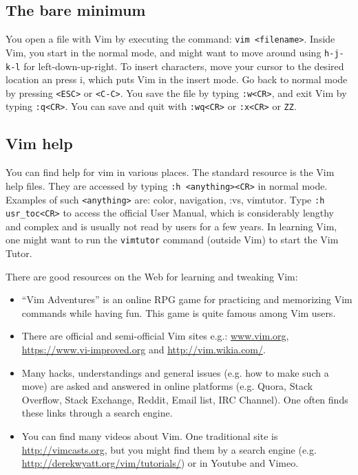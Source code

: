 \documentclass{article}
\newcommand{\tttt}[1]{\texttt{#1}}
\begin{document}
\subsection{The bare minimum}\label{minimum}
You open a file with Vim by executing
the command: \texttt{vim <filename>}.
Inside Vim, you start in the normal
mode, and might want to move around using
\texttt{h-j-k-l} for left-down-up-right.
To insert characters, move your
cursor to the desired location an press i,
which puts Vim in the insert mode.
Go back to normal mode by pressing
\texttt{<ESC>} or \texttt{<C-C>}.
You save the file by typing \texttt{:w<CR>},
and exit Vim by typing \texttt{:q<CR>}.
You can save and quit with \tttt{:wq<CR>}
or \tttt{:x<CR>} or \tttt{ZZ}.

\subsection{Vim help}
You can find help for vim in various places.
The standard resource is the Vim help files.
They are accessed by typing \texttt{:h <anything><CR>}
in normal mode.
Examples of such \texttt{<anything>} are:
color, navigation, :vs, vimtutor.
Type 
\texttt{:h usr\_toc<CR>}
to access the official User Manual,
which is considerably lengthy and complex
and is usually not read by users for a few years.
In learning Vim, one
might want to run the \texttt{vimtutor} command
(outside Vim) to start the Vim Tutor.

There are good resources on the Web for learning
and tweaking Vim:
\begin{itemize}
  \item ``Vim Adventures'' is an online RPG game for practicing
  and memorizing Vim commands while having fun.
  This game is quite famous among Vim users.
  \item There are official and semi-official Vim sites e.g.:
  \url{www.vim.org}, \url{https://www.vi-improved.org} and
  \url{http://vim.wikia.com/}.
  \item Many hacks, understandings and general issues
  (e.g. how to make such a move) are asked and answered
  in online platforms (e.g. Quora, Stack Overflow, Stack Exchange, Reddit, Email list, IRC Channel).
  One often finds these links through a search engine.
  \item You can find many videos about Vim.
  One traditional site is \url{http://vimcasts.org},
  but you might find them by a search engine (e.g. \url{http://derekwyatt.org/vim/tutorials/}) or in Youtube and Vimeo.
\end{itemize}
\end{document}

